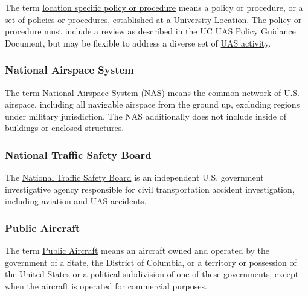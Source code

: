 \documentclass[
]{book}
\begin{document}
The term \protect\hyperlink{LSP}{location specific policy or procedure} means a policy or procedure, or a set of policies or procedures, established at a \protect\hyperlink{UL}{University Location}. The policy or procedure must include a review as described in the UC UAS Policy Guidance Document, but may be flexible to address a diverse set of \protect\hyperlink{UASactivity}{UAS activity}.





\hypertarget{NAS}{%
\subsubsection*{National Airspace System}\label{NAS}}

The term \protect\hyperlink{NAS}{National Airspace System} (NAS) means the common network of U.S. airspace, including all navigable airspace from the ground up, excluding regions under military jurisdiction. The NAS additionally does not include inside of buildings or enclosed structures.





\hypertarget{NTSB}{%
\subsubsection*{National Traffic Safety Board}\label{NTSB}}

The \protect\hyperlink{NTSB}{National Traffic Safety Board} is an independent U.S. government investigative agency responsible for civil transportation accident investigation, including aviation and UAS accidents.



\hypertarget{PA}{%
\subsubsection*{Public Aircraft}\label{PA}}

The term \protect\hyperlink{PA}{Public Aircraft} means an aircraft owned and operated by the government of a State, the District of Columbia, or a territory or possession of the United States or a political subdivision of one of these governments, except when the aircraft is operated for commercial purposes.
\end{document}
